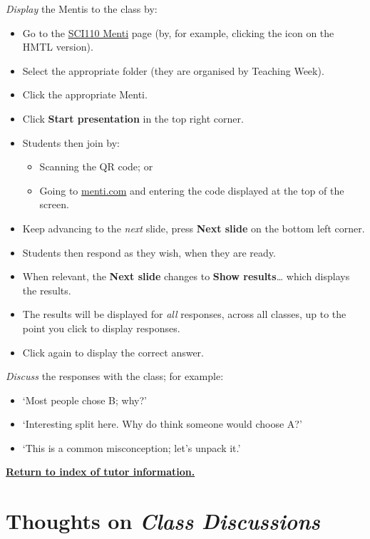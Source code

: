 \documentclass[
  11pt,
  a4paper,
  krantz2]{krantz}
\providecommand{\tightlist}{%
  \setlength{\itemsep}{0pt}\setlength{\parskip}{0pt}}
\begin{document}
\emph{Display} the Mentis to the class by:

\begin{itemize}
\tightlist
\item
  Go to the \href{https://www.mentimeter.com/app/folder/2889277}{SCI110 Menti} page (by, for example, clicking the icon on the HMTL version).
\item
  Select the appropriate folder (they are organised by Teaching Week).
\item
  Click the appropriate Menti.
\item
  Click \textbf{Start presentation} in the top right corner.
\item
  Students then join by:

  \begin{itemize}
  \tightlist
  \item
    Scanning the QR code; or
  \item
    Going to \url{menti.com} and entering the code displayed at the top of the screen.
  \end{itemize}
\item
  Keep advancing to the \emph{next} slide, press \textbf{Next slide} on the bottom left corner.
\item
  Students then respond as they wish, when they are ready.
\item
  When relevant, the \textbf{Next slide} changes to \textbf{Show results}\ldots{} which displays the results.
\item
  The results will be displayed for \emph{all} responses, across all classes, up to the point you click to display responses.
\item
  Click again to display the correct answer.
\end{itemize}

\emph{Discuss} the responses with the class; for example:

\begin{itemize}
\tightlist
\item
  `Most people chose B; why?'
\item
  `Interesting split here. Why do think someone would choose A?'
\item
  `This is a common misconception; let's unpack it.'
\end{itemize}

\hyperref[TutorInfo]{\textbf{Return to index of tutor information.}}

\section{\texorpdfstring{Thoughts on \emph{Class Discussions}}{Thoughts on Class Discussions}}\label{ClassDiscussions}
\end{document}
